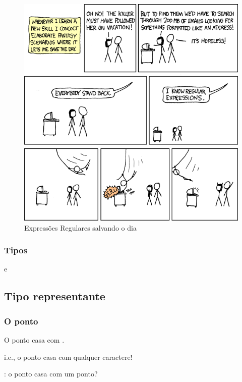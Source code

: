 \begin{frame}
	\begin{figure}
		\centering
			\includegraphics[height=0.8\textheight]{imagens/re/regular_expressions.png}
		\caption{Expressões Regulares salvando o dia}
	\end{figure}

\end{frame}

\begin{frame}
	\frametitle{Tipos}
	\Large{ e }
\end{frame}

\subsection{Tipo representante}


\begin{frame}
	\frametitle{O ponto}
	\Large{O ponto casa com .}
	
	i.e., o ponto casa com qualquer caractere!

	: o ponto casa com um ponto?
\end{frame}

